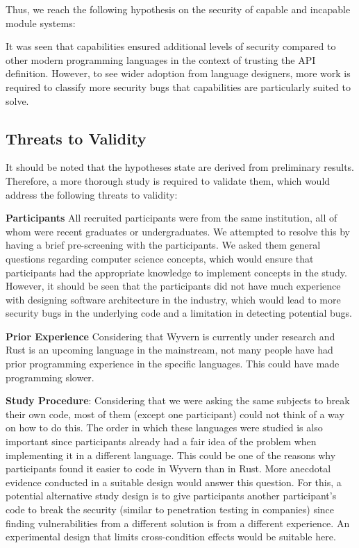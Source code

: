 \noindent
Thus, we reach the following hypothesis on the security of capable and incapable module systems: 

\begin{hyp}[Security]
It was seen that capabilities ensured additional levels of security compared to other modern programming languages in the context of trusting the API definition. However, to see wider adoption from language designers, more work is required to classify more security bugs that capabilities are particularly suited to solve. 
\end{hyp}
\subsection{Threats to Validity}
\noindent
It should be noted that the hypotheses state are derived from preliminary results. Therefore, a more thorough study is required to validate them, which would address the following threats to validity:

\noindent
\textbf{Participants} All recruited participants were from the same institution, all of whom were recent graduates or undergraduates. We attempted to resolve this by having a brief pre-screening with the participants. We asked them general questions regarding computer science concepts, which would ensure that participants had the appropriate knowledge to implement concepts in the study. However, it should be seen that the participants did not have much experience with designing software architecture in the industry, which would lead to more security bugs in the underlying code and a limitation in detecting potential bugs. 

\noindent
\textbf{Prior Experience} Considering that Wyvern is currently under research and Rust is an upcoming language in the mainstream, not many people have had prior programming experience in the specific languages. This could have made programming slower.

\noindent
\textbf{Study Procedure}: Considering that we were asking the same subjects to break their own code, most of them (except one participant) could not think of a way on how to do this. The order in which these languages were studied is also important since participants already had a fair idea of the problem when implementing it in a different language. This could be one of the reasons why participants found it easier to code in Wyvern than in Rust. More anecdotal evidence conducted in a suitable design would answer this question. For this, a potential alternative study design is to give participants another participant's code to break the security (similar to penetration testing in companies) since finding vulnerabilities from a different solution is from a different experience. An experimental design that limits cross-condition effects would be suitable here.  %